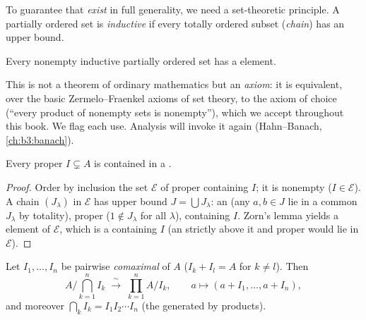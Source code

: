 To guarantee that  \emph{exist} in full generality,
we need a set-theoretic principle. A partially ordered set is
\emph{inductive} if every totally ordered subset (\emph{chain})
has an upper bound.

\begin{theorem}\label{thm:b3:rings:zorn}
Every nonempty inductive partially ordered set has a 
element.
\admitted
\end{theorem}

\begin{remark}\label{rem:b3:rings:zorn}
This is not a theorem of ordinary mathematics but an \emph{axiom}:
it is equivalent, over the basic Zermelo--Fraenkel axioms of set
theory, to the axiom of choice (``every product of nonempty sets
is nonempty''), which we accept throughout this book. We flag each
use. Analysis will invoke it again (Hahn--Banach,
\cref{ch:b3:banach}).
\end{remark}

\begin{theorem}[Krull]\label{thm:b3:rings:krull}
Every proper  $I \subsetneq A$ is contained in a .
\end{theorem}

\begin{proof}
Order by inclusion the set $\mathcal E$ of proper 
containing $I$; it is nonempty ($I \in \mathcal E$). A chain
$(J_\lambda)$ in $\mathcal E$ has upper bound $J = \bigcup
J_\lambda$: an  (any $a, b \in J$ lie in a common $J_\lambda$
by totality), proper ($1 \notin J_\lambda$ for all $\lambda$),
containing $I$. Zorn's lemma yields a  element of $\mathcal
E$, which is a  containing $I$ (an  strictly
above it and proper would lie in $\mathcal E$).
\end{proof}

\begin{theorem}\label{thm:b3:rings:crt}
Let $I_1, \dots, I_n$ be pairwise \emph{comaximal}  of $A$ ($I_k + I_l = A$ for $k \neq l$). Then
\[
A\Big/\bigcap_{k=1}^n I_k \;\xrightarrow{\;\sim\;}\;
\prod_{k=1}^n A/I_k,
\qquad
a \longmapsto (a + I_1, \dots, a + I_n),
\]
and moreover $\bigcap_k I_k = I_1 I_2 \cdots I_n$ (the 
generated by products).
\end{theorem}

